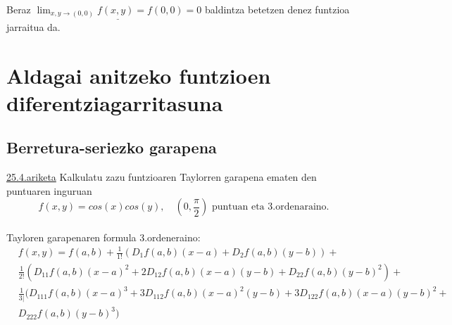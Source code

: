 Beraz $\underline{\lim_{x,y \to (0,0)}f(x,y)=f(0,0)=0}$ baldintza betetzen denez funtzioa jarraitua da.




\chapter{Aldagai anitzeko funtzioen diferentziagarritasuna}
\section{Berretura-seriezko garapena}
\underline{25.4.ariketa} Kalkulatu zazu funtzioaren Taylorren garapena ematen den puntuaren inguruan
\begin{equation*}
    f(x,y)=cos(x)cos(y), \quad (0,\frac{\pi}{2}) \text{ puntuan eta 3.ordenaraino.}
\end{equation*}
\\
Tayloren garapenaren formula 3.ordeneraino:
\begin{equation*}
\begin{split}
    &f(x,y)=f(a,b)+\frac{1}{1!}(D_1f(a,b)(x-a)+D_2f(a,b)(y-b))+\\
    &\frac{1}{2!}(D_{11}f(a,b)(x-a)^2 +2 D_{12}f(a,b)(x-a)(y-b)+D_{22}f(a,b)(y-b)^2)+\\
    &\frac{1}{3|}(D_{111}f(a,b)(x-a)^3+3D_{112}f(a,b)(x-a)^2(y-b)+3D_{122}f(a,b)(x-a)(y-b)^2+\\
    &D_{222}f(a,b)(y-b)^3)
\end{split}
\end{equation*}
